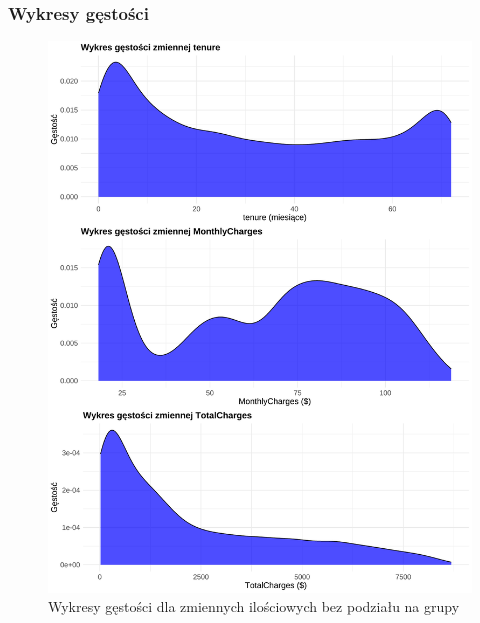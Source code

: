 \documentclass[12pt, a4paper]{article}\usepackage[]{graphicx}\usepackage[]{xcolor}
\makeatletter
\def\maxwidth{ %
  \ifdim\Gin@nat@width>\linewidth
    \linewidth
  \else
    \Gin@nat@width
  \fi
}
\newenvironment{knitrout}{}{} %
\makeatother
\begin{document}
\subsubsection{Wykresy gęstości}
\begin{knitrout}
\color{fgcolor}\begin{figure}[H]

{\centering \includegraphics[width=\maxwidth]{figure/gestosc-wszystkie-dane-1} 

}

\caption[Wykresy gęstości dla zmiennych ilościowych bez podziału na grupy]{Wykresy gęstości dla zmiennych ilościowych bez podziału na grupy}\label{fig:gestosc-wszystkie-dane}
\end{figure}

\end{knitrout}
\end{document}
